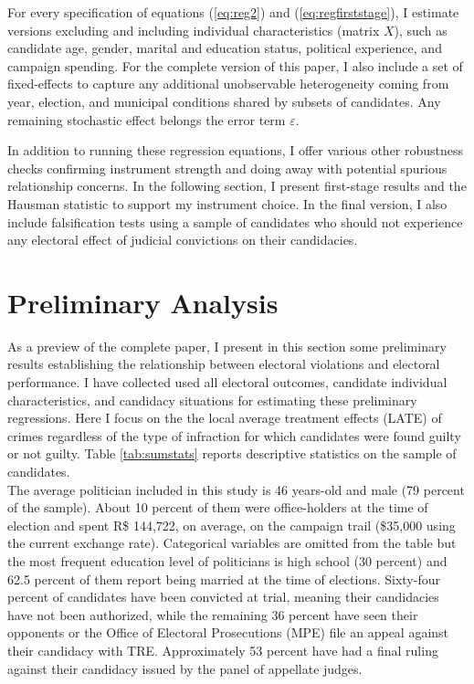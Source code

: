 \documentclass[11pt]{article}
\newcommand{\refp}[1]{(\ref{#1})}
\begin{document}
For every specification of equations \refp{eq:reg2} and \refp{eq:regfirststage}, I estimate versions excluding and including individual characteristics (matrix $X$), such as candidate age, gender, marital and education status, political experience, and campaign spending. For the complete version of this paper, I also include a set of fixed-effects to capture any additional unobservable heterogeneity coming from year, election, and municipal conditions shared by subsets of candidates. Any remaining stochastic effect belongs the error term $\varepsilon$.

In addition to running these regression equations, I offer various other robustness checks confirming instrument strength and doing away with potential spurious relationship concerns. In the following section, I present first-stage results and the Hausman statistic to support my instrument choice. In the final version, I also include falsification tests using a sample of candidates who should not experience any electoral effect of judicial convictions on their candidacies.

\section{Preliminary Analysis} \label{sec:results_paper1}

As a preview of the complete paper, I present in this section some preliminary results establishing the relationship between electoral violations and electoral performance. I have collected used all electoral outcomes, candidate individual characteristics, and candidacy situations for estimating these preliminary regressions. Here I focus on the the local average treatment effects (LATE) of crimes regardless of the type of infraction for which candidates were found guilty or not guilty. Table \ref{tab:sumstats} reports descriptive statistics on the sample of candidates. \\



The average politician included in this study is 46 years-old and male (79 percent of the sample). About 10 percent of them were office-holders at the time of election and spent R\$ 144,722, on average, on the campaign trail (\$35,000 using the current exchange rate). Categorical variables are omitted from the table but the most frequent education level of politicians is high school (30 percent) and 62.5 percent of them report being married at the time of elections. Sixty-four percent of candidates have been convicted at trial, meaning their candidacies have not been authorized, while the remaining 36 percent have seen their opponents or the Office of Electoral Prosecutions (MPE) file an appeal against their candidacy with TRE. Approximately 53 percent have had a final ruling against their candidacy issued by the panel of appellate judges. \\
\end{document}
